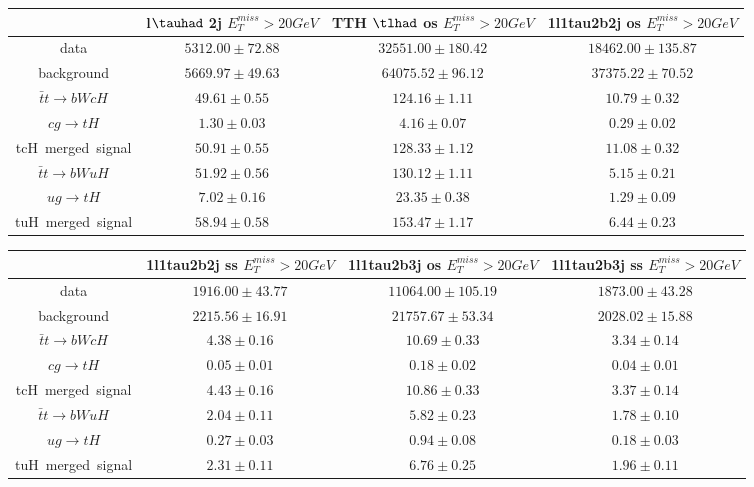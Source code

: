 \begin{tabular}{|c|c|c|c|} \hline
 & l$\tauhad$ 2j  $E_T^{miss}>20GeV$ & TTH $\tlhad$ os  $E_T^{miss}>20GeV$ & 1l1tau2b2j os  $E_T^{miss}>20GeV$\\\hline
data & $5312.00\pm72.88$ & $32551.00\pm180.42$ & $18462.00\pm135.87$\\\hline
background & $5669.97\pm49.63$ & $64075.52\pm96.12$ & $37375.22\pm70.52$\\\hline
$\bar{t}t\to bWcH$ & $49.61\pm0.55$ & $124.16\pm1.11$ & $10.79\pm0.32$\\\hline
$cg\to tH$ & $1.30\pm0.03$ & $4.16\pm0.07$ & $0.29\pm0.02$\\\hline
tcH~merged~signal & $50.91\pm0.55$ & $128.33\pm1.12$ & $11.08\pm0.32$\\\hline
$\bar{t}t\to bWuH$ & $51.92\pm0.56$ & $130.12\pm1.11$ & $5.15\pm0.21$\\\hline
$ug\to tH$ & $7.02\pm0.16$ & $23.35\pm0.38$ & $1.29\pm0.09$\\\hline
tuH~merged~signal & $58.94\pm0.58$ & $153.47\pm1.17$ & $6.44\pm0.23$\\\hline
\end{tabular}
\begin{tabular}{|c|c|c|c|} \hline
 & 1l1tau2b2j ss  $E_T^{miss}>20GeV$ & 1l1tau2b3j os  $E_T^{miss}>20GeV$ & 1l1tau2b3j ss  $E_T^{miss}>20GeV$\\\hline
data & $1916.00\pm43.77$ & $11064.00\pm105.19$ & $1873.00\pm43.28$\\\hline
background & $2215.56\pm16.91$ & $21757.67\pm53.34$ & $2028.02\pm15.88$\\\hline
$\bar{t}t\to bWcH$ & $4.38\pm0.16$ & $10.69\pm0.33$ & $3.34\pm0.14$\\\hline
$cg\to tH$ & $0.05\pm0.01$ & $0.18\pm0.02$ & $0.04\pm0.01$\\\hline
tcH~merged~signal & $4.43\pm0.16$ & $10.86\pm0.33$ & $3.37\pm0.14$\\\hline
$\bar{t}t\to bWuH$ & $2.04\pm0.11$ & $5.82\pm0.23$ & $1.78\pm0.10$\\\hline
$ug\to tH$ & $0.27\pm0.03$ & $0.94\pm0.08$ & $0.18\pm0.03$\\\hline
tuH~merged~signal & $2.31\pm0.11$ & $6.76\pm0.25$ & $1.96\pm0.11$\\\hline
\end{tabular}
